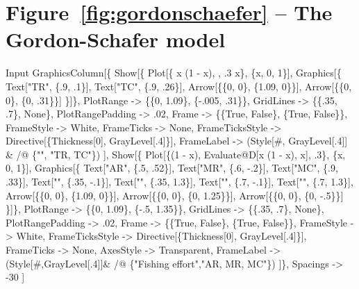 \documentclass[11pt,fleqn]{book} %
\begin{document}
\section*{Figure~\ref{fig:gordonschaefer} -- The Gordon-Schafer model }
\small{
\begin{mmaCell}[index=1]{Input}
  GraphicsColumn[\{
    Show[\{
      Plot[\{ x (1 - x), , .3 x\}, \{x, 0, 1\}],
      Graphics[\{
        Text["TR", \{.9, .1\}],
        Text["TC", \{.9, .26\}],
        Arrow[\{\{0, 0\}, \{1.09, 0\}\}],
        Arrow[\{\{0, 0\}, \{0, .31\}\}]
      \}]\},
      PlotRange        -> \{\{0, 1.09\}, \{-.005, .31\}\},
      GridLines        -> \{\{.35, .7\}, None\},
      PlotRangePadding -> .02,
      Frame            -> \{\{True, False\}, \{True, False\}\},
      FrameStyle       -> White,
      FrameTicks       -> None,
      FrameTicksStyle  -> Directive[\{Thickness[0], GrayLevel[.4]\}],
      FrameLabel       -> (Style[#, GrayLevel[.4]] & /@ \{"", "TR, TC"\})
    ],
    Show[\{
      Plot[\{(1 - x), Evaluate@D[x (1 - x), x], .3\}, \{x, 0, 1\}],
      Graphics[\{
        Text["AR", \{.5, .52\}],
        Text["MR", \{.6, -.2\}],
        Text["MC", \{.9, .33\}],
        Text["", \{.35, -.1\}],
        Text["", \{.35, 1.3\}],
        Text["", \{.7, -.1\}],
        Text["", \{.7, 1.3\}],
        Arrow[\{\{0, 0\}, \{1.09, 0\}\}],
        Arrow[\{\{0, 0\}, \{0, 1.25\}\}],
        Arrow[\{\{0, 0\}, \{0, -.5\}\}]
      \}]\},
      PlotRange        -> \{\{0, 1.09\}, \{-.5, 1.35\}\},
      GridLines        -> \{\{.35, .7\}, None\},
      PlotRangePadding -> .02,
      Frame            -> \{\{True, False\}, \{True, False\}\},
      FrameStyle       -> White,
      FrameTicksStyle  -> Directive[\{Thickness[0], GrayLevel[.4]\}],
      FrameTicks       -> None, 
      AxesStyle        -> Transparent,
      FrameLabel       -> (Style[#,GrayLevel[.4]]& /@ \{"Fishing effort","AR, MR, MC"\})
    ]\}, 
    Spacings -> -30
  ]
\end{mmaCell}
}

\end{document}
